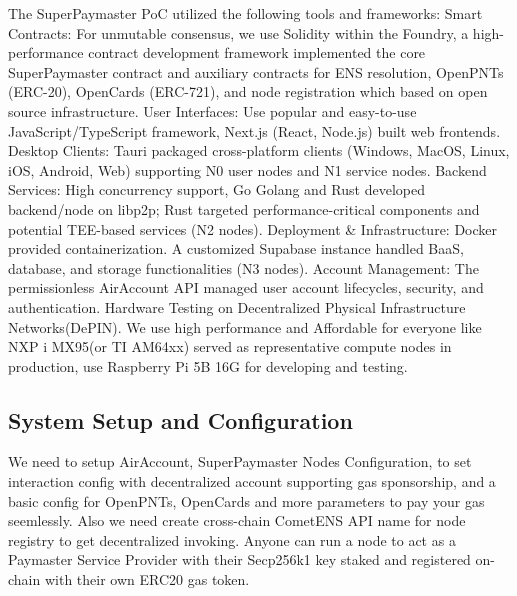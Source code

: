 \documentclass[preprint,12pt]{elsarticle}
\begin{document}
The SuperPaymaster PoC utilized the following tools and frameworks: Smart Contracts: For unmutable consensus, we use Solidity\cite{solidity} within the Foundry\cite{foundry}, a high-performance contract development framework implemented the core SuperPaymaster contract and auxiliary contracts for ENS resolution, OpenPNTs (ERC-20), OpenCards (ERC-721), and node registration which based on open source infrastructure. User Interfaces: Use popular and easy-to-use JavaScript/TypeScript framework, Next.js\cite{nextjs} (React\cite{react}, Node.js\cite{nodejs}) built web frontends. Desktop Clients: Tauri\cite{tauri} packaged cross-platform clients (Windows, MacOS, Linux, iOS, Android, Web) supporting N0 user nodes and N1 service nodes. Backend Services: High concurrency support, Go Golang\cite{golang} and Rust\cite{rust} developed backend/node on libp2p; Rust targeted performance-critical components and potential TEE-based services (N2 nodes). Deployment \& Infrastructure: Docker\cite{docker} provided containerization. A customized Supabase\cite{supabase} instance handled BaaS, database, and storage functionalities (N3 nodes). Account Management: The permissionless AirAccount API\cite{airaccount} managed user account lifecycles, security, and authentication. Hardware Testing on Decentralized Physical Infrastructure Networks(DePIN)\cite{depin2023}. We use high performance and Affordable for everyone like NXP i MX95(or TI AM64xx) served as representative compute nodes in production, use Raspberry Pi 5B 16G for developing and testing\cite{nxp-imx95}.

\subsection{System Setup and Configuration}
\label{subsec:system-setup}

We need to setup AirAccount, SuperPaymaster Nodes Configuration, to set interaction config with decentralized account supporting gas sponsorship, and a basic config for OpenPNTs, OpenCards and more parameters to pay your gas seemlessly. Also we need create cross-chain CometENS API name for node registry to get decentralized invoking. Anyone can run a node to act as a Paymaster Service Provider with their Secp256k1 key staked and registered on-chain with their own ERC20 gas token.
\end{document}
